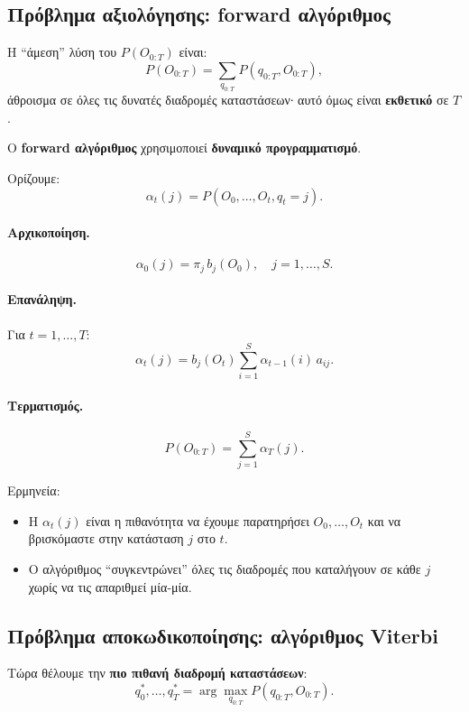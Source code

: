 \documentclass[a4paper,11pt]{article}
\begin{document}
\subsection{Πρόβλημα αξιολόγησης: forward αλγόριθμος}

Η ``άμεση'' λύση του $P(O_{0:T})$ είναι:
\[
P(O_{0:T}) = \sum_{q_{0:T}} P(q_{0:T},O_{0:T}),
\]
άθροισμα σε όλες τις δυνατές διαδρομές καταστάσεων∙ αυτό όμως είναι
\textbf{εκθετικό} σε $T$.

Ο \textbf{forward αλγόριθμος} χρησιμοποιεί \textbf{δυναμικό προγραμματισμό}.

Ορίζουμε:
\[
\alpha_t(j) = P(O_0,\dots,O_t, q_t=j).
\]

\paragraph{Αρχικοποίηση.}
\[
\alpha_0(j) = \pi_j\, b_j(O_0), \quad j=1,\dots,S.
\]

\paragraph{Επανάληψη.}
Για $t=1,\dots,T$:
\[
\alpha_t(j) = b_j(O_t) \sum_{i=1}^S \alpha_{t-1}(i)\, a_{ij}.
\]

\paragraph{Τερματισμός.}
\[
P(O_{0:T}) = \sum_{j=1}^S \alpha_T(j).
\]

Ερμηνεία:
\begin{itemize}
  \item Η $\alpha_t(j)$ είναι η πιθανότητα να έχουμε παρατηρήσει
        $O_0,\dots,O_t$ και να βρισκόμαστε στην κατάσταση $j$ στο $t$.
  \item Ο αλγόριθμος ``συγκεντρώνει'' όλες τις διαδρομές που καταλήγουν σε κάθε $j$
        χωρίς να τις απαριθμεί μία-μία.
\end{itemize}

\subsection{Πρόβλημα αποκωδικοποίησης: αλγόριθμος Viterbi}

Τώρα θέλουμε την \textbf{πιο πιθανή διαδρομή καταστάσεων}:
\[
q_0^\ast,\dots,q_T^\ast = \arg\max_{q_{0:T}} P(q_{0:T},O_{0:T}).
\]
\end{document}
